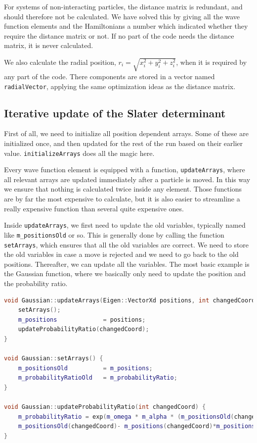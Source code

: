 For systems of non-interacting particles, the distance matrix is redundant, and should therefore not be calculated. We have solved this by giving all the wave function elements and the Hamiltonians a number which indicated whether they require the distance matrix or not. If no part of the code needs the distance matrix, it is never calculated. 

We also calculate the radial position, $r_i=\sqrt{x_i^2+y_i^2+z_i^2}$, when it is required by any part of the code. There components are stored in a vector named \texttt{radialVector}, applying the same optimization ideas as the distance matrix. 

\subsection{Iterative update of the Slater determinant} \label{sec:updateslater}


First of all, we need to initialize all position dependent arrays. Some of these are initialized once, and then updated for the rest of the run based on their earlier value. \texttt{initializeArrays} does all the magic here.

Every wave function element is equipped with a function, \texttt{updateArrays}, where all relevant arrays are updated immediately after a particle is moved. In this way we ensure that nothing is calculated twice inside any element. Those functions are by far the most expensive to calculate, but it is also easier to streamline a really expensive function than several quite expensive ones. 

Inside \texttt{updateArrays}, we first need to update the old variables, typically named like \texttt{m\_positionsOld} or so. This is generally done by calling the function \texttt{setArrays}, which ensures that all the old variables are correct. We need to store the old variables in case a move is rejected and we need to go back to the old positions. Thereafter, we can update all the variables. The most basic example is the Gaussian function, where we basically only need to update the position and the probability ratio.

\lstset{basicstyle=\scriptsize}
\begin{lstlisting}[language=c++,caption={from \texttt{gaussian.cpp}}]
void Gaussian::updateArrays(Eigen::VectorXd positions, int changedCoord) {
    setArrays();
    m_positions             = positions;
    updateProbabilityRatio(changedCoord);
}

void Gaussian::setArrays() {
    m_positionsOld          = m_positions;
    m_probabilityRatioOld   = m_probabilityRatio;
}

void Gaussian::updateProbabilityRatio(int changedCoord) {
    m_probabilityRatio = exp(m_omega * m_alpha * (m_positionsOld(changedCoord) * \
    m_positionsOld(changedCoord)- m_positions(changedCoord)*m_positions(changedCoord)));
}
\end{lstlisting}

